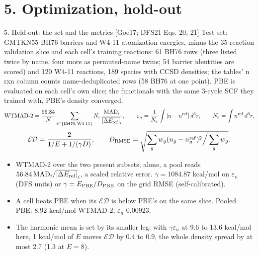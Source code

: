 \section{5. Optimization, hold-out}

\begin{frame}{5. Held-out: the set and the metrics [Goe17; DFS21 Eqs. 20, 21]}
  \small
  Test set: GMTKN55 BH76 barriers and W4-11 atomization energies, minus the 35-reaction validation slice and each cell's training reactions: 61 BH76 rows (three listed twice by name, four more as permuted-name twins; 54 barrier identities are scored) and 120 W4-11 reactions, 189 species with CCSD densities; the tables' n rxn column counts name-deduplicated rows (58 BH76 at one point). PBE is evaluated on each cell's own slice; the functionals with the same 3-cycle SCF they trained with, PBE's density converged.
  \[
  \mathrm{WTMAD\text{-}2} = \frac{56.84}{N}\sum_{i\in\{\rm BH76,\,W4\text{-}11\}} N_i\,\frac{\mathrm{MAD}_i}{\overline{|\Delta E_{\rm ref}|}_i}, \qquad
  \varepsilon_n = \frac{1}{N_e}\int |n - n^{\rm ref}|\, d^3r, \qquad N_e = \int n^{\rm ref}\, d^3r,
  \]
  \[
  \mathcal{ED} = \frac{2}{1/E + 1/(\gamma D)}, \qquad
  D_{\rm RMSE} = \sqrt{\sum_g w_g (n_g - n_g^{\rm ref})^2 \Big/ \sum_g w_g}.
  \]
  \footnotesize
  \begin{itemize}
    \item WTMAD-2 over the two present subsets; alone, a pool reads $56.84\,\mathrm{MAD}_i / \overline{|\Delta E_{\rm ref}|}_i$, a scaled relative error. $\gamma = 1084.87$ kcal/mol on $\varepsilon_n$ (DFS units) or $\gamma = E_{\rm PBE}/D_{\rm PBE}$ on the grid RMSE (self-calibrated).
    \item A cell beats PBE when its $\mathcal{ED}$ is below PBE's on the same slice. Pooled PBE: 8.92 kcal/mol WTMAD-2, $\varepsilon_n$ 0.00923.
    \item The harmonic mean is set by its smaller leg: with $\gamma\varepsilon_n$ at 9.6 to 13.6 kcal/mol here, 1 kcal/mol of $E$ moves $\mathcal{ED}$ by 0.4 to 0.9, the whole density spread by at most 2.7 (1.3 at $E = 8$).
  \end{itemize}
\end{frame}
